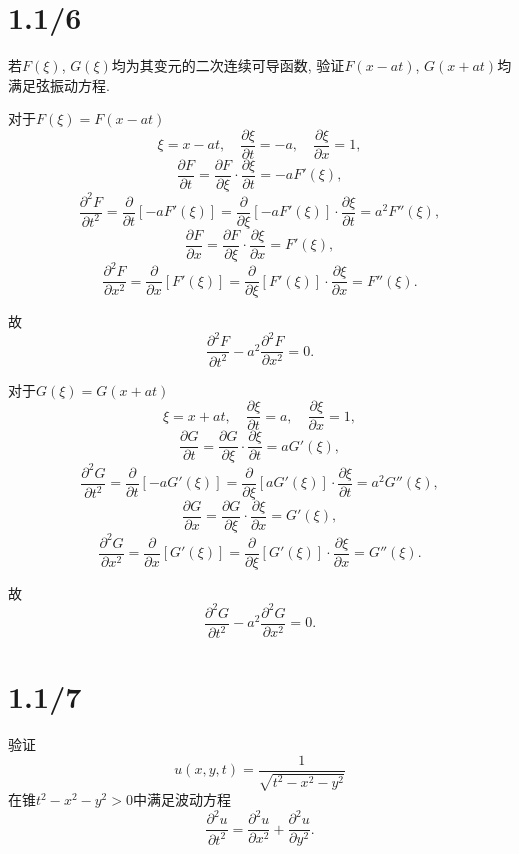 \documentclass[11pt,a4paper]{article}
\author{刘逸灏 (515370910207)}
\begin{document}
\maketitle

\section{1.1/6}

\begin{problem}
若$F(\xi)$, $G(\xi)$均为其变元的二次连续可导函数, 验证$F(x-at)$, $G(x+at)$均满足弦振动方程.
\end{problem}

对于$F(\xi)=F(x-at)$
$$\xi=x-at,\quad \frac{\partial \xi}{\partial t}=-a,\quad \frac{\partial \xi}{\partial x}=1,$$
$$\frac{\partial F}{\partial t}=\frac{\partial F}{\partial \xi}\cdot\frac{\partial \xi}{\partial t}=-aF'(\xi),$$
$$\frac{\partial^2 F}{\partial t^2}=\frac{\partial}{\partial t}[-aF'(\xi)]=\frac{\partial}{\partial \xi}[-aF'(\xi)]\cdot\frac{\partial \xi}{\partial t}=a^2F''(\xi),$$
$$\frac{\partial F}{\partial x}=\frac{\partial F}{\partial \xi}\cdot\frac{\partial \xi}{\partial x}=F'(\xi),$$
$$\frac{\partial^2 F}{\partial x^2}=\frac{\partial}{\partial x}[F'(\xi)]=\frac{\partial}{\partial \xi}[F'(\xi)]\cdot\frac{\partial \xi}{\partial x}=F''(\xi).$$

故$$\frac{\partial^2 F}{\partial t^2}-a^2\frac{\partial^2 F}{\partial x^2}=0.$$

对于$G(\xi)=G(x+at)$
$$\xi=x+at,\quad \frac{\partial \xi}{\partial t}=a,\quad \frac{\partial \xi}{\partial x}=1,$$
$$\frac{\partial G}{\partial t}=\frac{\partial G}{\partial \xi}\cdot\frac{\partial \xi}{\partial t}=aG'(\xi),$$
$$\frac{\partial^2 G}{\partial t^2}=\frac{\partial}{\partial t}[-aG'(\xi)]=\frac{\partial}{\partial \xi}[aG'(\xi)]\cdot\frac{\partial \xi}{\partial t}=a^2G''(\xi),$$
$$\frac{\partial G}{\partial x}=\frac{\partial G}{\partial \xi}\cdot\frac{\partial \xi}{\partial x}=G'(\xi),$$
$$\frac{\partial^2 G}{\partial x^2}=\frac{\partial}{\partial x}[G'(\xi)]=\frac{\partial}{\partial \xi}[G'(\xi)]\cdot\frac{\partial \xi}{\partial x}=G''(\xi).$$

故$$\frac{\partial^2 G}{\partial t^2}-a^2\frac{\partial^2 G}{\partial x^2}=0.$$

\section{1.1/7}

\begin{problem}
验证
$$u(x,y,t)=\frac{1}{\sqrt{t^2-x^2-y^2}}$$
在锥$t^2-x^2-y^2>0$中满足波动方程
$$\frac{\partial^2u}{\partial t^2}=\frac{\partial^2u}{\partial x^2}+\frac{\partial^2u}{\partial y^2}.$$
\end{problem}
\end{document}

